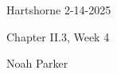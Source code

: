 \documentclass[12pt]{amsart}
\begin{document}
{Hartshorne} \hfill {2-14-2025}

\bigskip\bigskip

\begin{center}

{\sc Chapter II.3, Week 4}

\end{center}

\begin{center}

  {Noah Parker} %
    
\end{center}

\bigskip

% 
\end{document}
